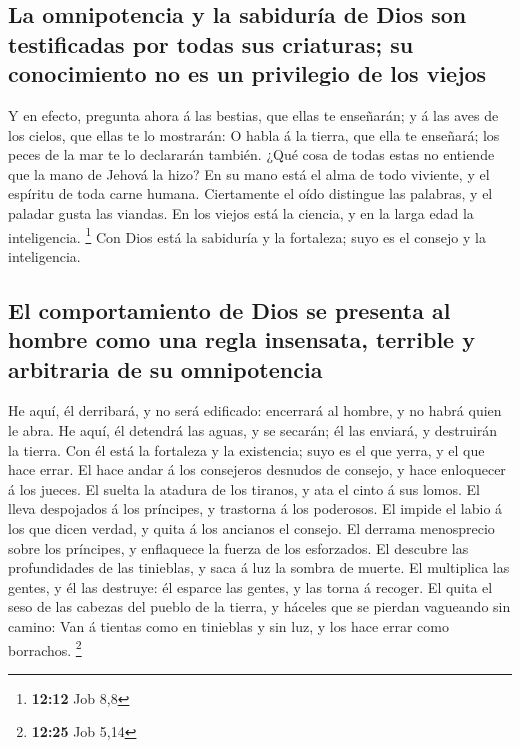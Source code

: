 \hypertarget{la-omnipotencia-y-la-sabiduruxeda-de-dios-son-testificadas-por-todas-sus-criaturas-su-conocimiento-no-es-un-privilegio-de-los-viejos}{%
\subsection{La omnipotencia y la sabiduría de Dios son testificadas por
todas sus criaturas; su conocimiento no es un privilegio de los
viejos}\label{la-omnipotencia-y-la-sabiduruxeda-de-dios-son-testificadas-por-todas-sus-criaturas-su-conocimiento-no-es-un-privilegio-de-los-viejos}}

 Y en efecto, pregunta ahora á las bestias, que ellas te
enseñarán; y á las aves de los cielos, que ellas te lo mostrarán:
 O habla á la tierra, que ella te enseñará; los peces de la
mar te lo declararán también.  ¿Qué cosa de todas estas no
entiende que la mano de Jehová la hizo?  En su mano está el
alma de todo viviente, y el espíritu de toda carne humana. 
Ciertamente el oído distingue las palabras, y el paladar gusta las
viandas.  En los viejos está la ciencia, y en la larga edad
la inteligencia. \footnote{\textbf{12:12} Job 8,8}  Con
Dios está la sabiduría y la fortaleza; suyo es el consejo y la
inteligencia.

\hypertarget{el-comportamiento-de-dios-se-presenta-al-hombre-como-una-regla-insensata-terrible-y-arbitraria-de-su-omnipotencia}{%
\subsection{El comportamiento de Dios se presenta al hombre como una
regla insensata, terrible y arbitraria de su
omnipotencia}\label{el-comportamiento-de-dios-se-presenta-al-hombre-como-una-regla-insensata-terrible-y-arbitraria-de-su-omnipotencia}}

 He aquí, él derribará, y no será edificado: encerrará al
hombre, y no habrá quien le abra.  He aquí, él detendrá las
aguas, y se secarán; él las enviará, y destruirán la tierra.
 Con él está la fortaleza y la existencia; suyo es el que
yerra, y el que hace errar.  El hace andar á los consejeros
desnudos de consejo, y hace enloquecer á los jueces.  El
suelta la atadura de los tiranos, y ata el cinto á sus lomos.
 El lleva despojados á los príncipes, y trastorna á los
poderosos.  El impide el labio á los que dicen verdad, y
quita á los ancianos el consejo.  El derrama menosprecio
sobre los príncipes, y enflaquece la fuerza de los esforzados.
 El descubre las profundidades de las tinieblas, y saca á
luz la sombra de muerte.  El multiplica las gentes, y él
las destruye: él esparce las gentes, y las torna á recoger.
 El quita el seso de las cabezas del pueblo de la tierra, y
háceles que se pierdan vagueando sin camino:  Van á tientas
como en tinieblas y sin luz, y los hace errar como borrachos.
\footnote{\textbf{12:25} Job 5,14}

